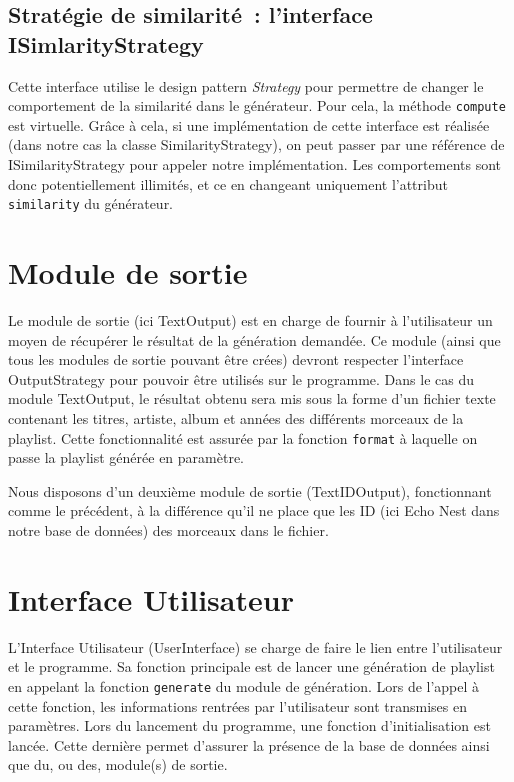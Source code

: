 \subsection{Stratégie de similarité~: l'interface ISimlarityStrategy}
\label{archi:generation:similarity}

Cette interface utilise le design pattern \emph{Strategy} pour permettre de
changer le comportement de la similarité dans le générateur. Pour cela,
la méthode \texttt{compute} est virtuelle. Grâce à cela, si une implémentation
de cette interface est réalisée (dans notre cas la classe SimilarityStrategy),
on peut passer par une référence de ISimilarityStrategy pour appeler notre
implémentation. Les comportements sont donc potentiellement illimités, et ce
en changeant uniquement l'attribut \texttt{similarity} du générateur.

\section{Module de sortie}
\label{archi:sortie}

Le module de sortie (ici TextOutput) est en charge de fournir à 
l'utilisateur un moyen de récupérer le résultat de la génération demandée. 
Ce module (ainsi que tous les modules de sortie pouvant être crées) devront 
respecter l'interface OutputStrategy pour pouvoir être utilisés sur le 
programme. Dans le cas du module TextOutput, le résultat obtenu sera mis 
sous la forme d'un fichier texte contenant les titres, artiste, album et années 
des différents morceaux de la playlist. Cette fonctionnalité est assurée par la fonction 
\texttt{format} à laquelle on passe la playlist générée en paramètre.

Nous disposons d'un deuxième module de sortie (TextIDOutput), fonctionnant 
comme le précédent, à la différence qu'il ne place que les ID (ici Echo 
Nest dans notre base de données) des morceaux dans le fichier.

\section{Interface Utilisateur}
\label{archi:interface}

L'Interface Utilisateur (UserInterface) se charge de faire le lien entre
l'utilisateur et le programme. Sa fonction principale est de lancer une
génération de playlist en appelant la fonction \texttt{generate} du module de 
génération. Lors de l'appel à cette fonction, les informations rentrées par 
l'utilisateur sont transmises en paramètres. Lors du lancement du programme,
une fonction d'initialisation est lancée. Cette dernière permet d'assurer 
la présence de la base de données ainsi que du, ou des, module(s) de sortie.

